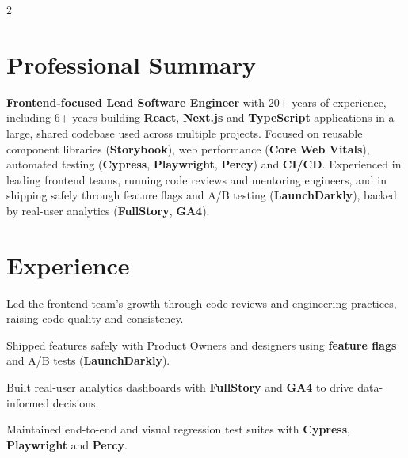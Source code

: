 \documentclass[]{main}
\begin{document}
\begin{paracol}{2}

\switchcolumn[0]


\section{Professional Summary}
\begin{minipage}{\linewidth}
   \textbf{Frontend-focused Lead Software Engineer} with 20+ years of experience, including 6+ years building
   \textbf{React}, \textbf{Next.js} and \textbf{TypeScript} applications in a large, shared codebase used across multiple projects.
   Focused on reusable component libraries (\textbf{Storybook}), web performance (\textbf{Core Web Vitals}),
   automated testing (\textbf{Cypress}, \textbf{Playwright}, \textbf{Percy}) and
   \textbf{CI/CD}. Experienced in leading frontend teams, running code reviews and mentoring engineers, and in
   shipping safely through feature flags and A/B testing (\textbf{LaunchDarkly}), backed by real-user
   analytics (\textbf{FullStory}, \textbf{GA4}).
\end{minipage}
\sectionsep


\section{Experience}
\begin{tightemize}
    \item Led the frontend team's growth through code reviews and engineering practices, raising code quality and consistency.
    \item Shipped features safely with Product Owners and designers using \textbf{feature flags} and A/B tests (\textbf{LaunchDarkly}).
    \item Built real-user analytics dashboards with \textbf{FullStory} and \textbf{GA4} to drive data-informed decisions.
    \item Maintained end-to-end and visual regression test suites with \textbf{Cypress}, \textbf{Playwright} and \textbf{Percy}.
\end{tightemize}
\sectionsep


\end{paracol}
\end{document}
